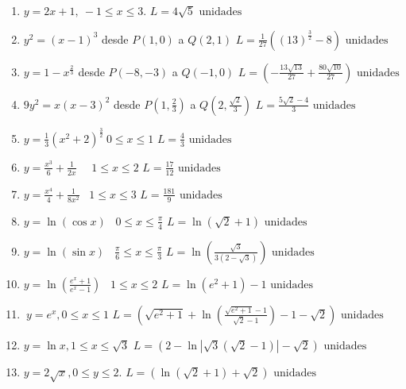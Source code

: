 {\small
\begin{enumerate}
	
\item {$y=2x+1,\ -1\leq x\leq 3.$} {$L=4\sqrt{5}\text{ unidades}$}

\item {$y^{2}=(x-1)^{3}$ desde $P(1,0)$ a $Q(2,1)$}
{$L=\frac{1}{27}((13)^{\frac{3}{2}}-8) \text{ unidades}$}

\item {$y=1-x^{\frac{2}{3}}$ desde  $ P(-8,-3)$ a $Q(-1,0)$} {$L=\left( -\frac{13\sqrt{13}}{27}+\frac{80\sqrt{10}}{27}\right)
	\text{ unidades}$}

\item {$9y^{2}=x(x-3)^{2}$ desde $P(1,\frac{2}{3})$ a $ Q(2,\frac{\sqrt{2}}{3})$} {$L=\frac{5\sqrt{2}-4}{3}\text{ unidades}$}

\item {$y=\frac{1}{3}(x^{2}+2)^{\frac{3}{2}}\ 0\leq x\leq 1$} {$L=\frac{4}{3}\text{ unidades}$}

\item {$y=\frac{x^{3}}{6}+\frac{1}{2x}$ \ \ $1\leq x\leq 2$} {$L=\frac{17}{12}\text{ unidades}$}

\item {$y=\frac{x^{4}}{4}+\frac{1}{8x^{2}}$ \ $1\leq x\leq 3$} {$L=\frac{181}{9}\text{ unidades}$}

\item {$y=\ln (\cos x)$ \ $0\leq x\leq \frac{\pi }{4}$} {$L=\ln (\sqrt{2}+1) \text{ unidades}$}

\item {$y=\ln (\sin x)$ \ $\frac{\pi }{6}\leq x\leq \frac{\pi }{3}$} {$L=\ln \left( \frac{\sqrt{3}}{3(2-\sqrt{3})}\right) \text{ unidades}$}

\item {$y=\ln (\frac{e^{x}+1}{e^{x}-1})$ \ $1\leq x\leq 2$
} {$L=\ln \left( e^{2}+1\right) -1
\text{ unidades}$}

\item {$\ y=e^{x},0\leq x\leq 1$} {$L=\left( \sqrt{e^{2}+1}+\ln \left( \frac{\sqrt{e^{2}+1}-1}{\sqrt{2}-1}%
	\right) -1-\sqrt{2}\right) \text{ unidades}$}

\item { $y=\ln x,1\leq x\leq \sqrt{3}$} {$L=\left( 2-\ln \left\vert \sqrt{3}(\sqrt{2}-1)\right\vert -\sqrt{2}\right) \text{ unidades}$}

\item {$y=2\sqrt{x},0\leq y\leq 2.$} {$L=\allowbreak \left( \ln \left( \sqrt{2}+1\right) +\sqrt{2}\right) \text{ unidades}$}
\end{enumerate}
}



